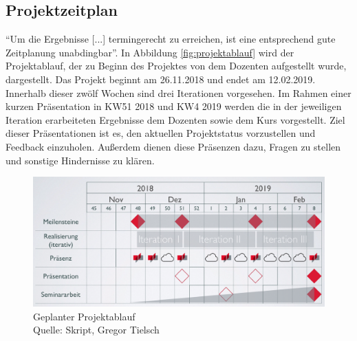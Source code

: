 	\subsection{Projektzeitplan}
	\enquote{Um die Ergebnisse [...] termingerecht zu erreichen, ist eine entsprechend gute Zeitplanung unabdingbar}\autocite[][S. 90]{projektmanagement}.
	In Abbildung \vref{fig:projektablauf} wird der Projektablauf, der zu Beginn des Projektes von dem Dozenten aufgestellt wurde, dargestellt. Das Projekt beginnt am 26.11.2018 und endet am 12.02.2019. Innerhalb dieser zwölf Wochen sind drei Iterationen vorgesehen. Im Rahmen einer kurzen Präsentation in KW51 2018 und KW4 2019 werden die in der jeweiligen Iteration erarbeiteten Ergebnisse dem Dozenten sowie dem Kurs vorgestellt. Ziel dieser Präsentationen ist es, den aktuellen Projektstatus vorzustellen und Feedback einzuholen. Außerdem dienen diese Präsenzen dazu, Fragen zu stellen und sonstige Hindernisse zu klären. 
	\begin{figure}[H]
		\centering 
		\includegraphics[width=11.5cm]{img/geplanterProjektablauf.png}
		\captionsetup{format=hang}
		\caption[Geplanter Projektablauf ]{\label{fig:projektablauf} Geplanter Projektablauf \\ Quelle: Skript, Gregor Tielsch }
	\end{figure}
	
